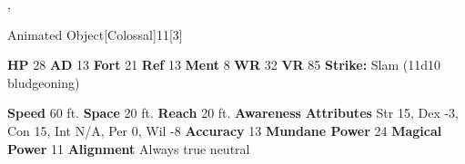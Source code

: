   ,
  \begin{monsubsection}{Animated Object}[Colossal]{11}[3]
    \vspace{-1em}\vspace{-1em}
    \vspace{0em}

    
    

    \begin{spellcontent}
      \begin{spelltargetinginfo}
        \pari \textbf{HP} 28 \monsep
          \textbf{AD} 13 \monsep
          \textbf{Fort} 21 \monsep
          \textbf{Ref} 13 \monsep
          \textbf{Ment} 8
        \pari \textbf{WR} 32 \monsep
        \textbf{VR} 85
        \pari \textbf{Strike:}
            Slam  (11d10 bludgeoning)
      \end{spelltargetinginfo}
    \end{spellcontent}
    \begin{monsterfooter}
      \pari \textbf{Speed} 60 ft. \monsep
        \textbf{Space} 20 ft. \monsep
        \textbf{Reach} 20 ft.
      \pari \textbf{Awareness} 
      \pari \textbf{Attributes}
        Str 15, Dex -3,
        Con 15, Int N/A,
        Per 0, Wil -8
      \pari \textbf{Accuracy} 13 \monsep
        \textbf{Mundane Power} 24 \monsep
      \textbf{Magical Power} 11
      \pari \textbf{Alignment} Always true neutral
    \end{monsterfooter}
  \end{monsubsection}
  
  
  
